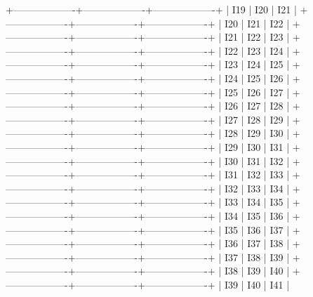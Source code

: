 +-------------------+-------------------+-------------------+
|       I19          |       I20          |       I21         |
+-------------------+-------------------+-------------------+
|       I20          |       I21          |       I22         |
+-------------------+-------------------+-------------------+
|       I21          |       I22          |       I23         |
+-------------------+-------------------+-------------------+
|       I22          |       I23          |       I24         |
+-------------------+-------------------+-------------------+
|       I23          |       I24          |       I25         |
+-------------------+-------------------+-------------------+
|       I24          |       I25          |       I26         |
+-------------------+-------------------+-------------------+
|       I25          |       I26          |       I27         |
+-------------------+-------------------+-------------------+
|       I26          |       I27          |       I28         |
+-------------------+-------------------+-------------------+
|       I27          |       I28          |       I29         |
+-------------------+-------------------+-------------------+
|       I28          |       I29          |       I30         |
+-------------------+-------------------+-------------------+
|       I29          |       I30          |       I31         |
+-------------------+-------------------+-------------------+
|       I30          |       I31          |       I32         |
+-------------------+-------------------+-------------------+
|       I31          |       I32          |       I33         |
+-------------------+-------------------+-------------------+
|       I32          |       I33          |       I34         |
+-------------------+-------------------+-------------------+
|       I33          |       I34          |       I35         |
+-------------------+-------------------+-------------------+
|       I34          |       I35          |       I36         |
+-------------------+-------------------+-------------------+
|       I35          |       I36          |       I37         |
+-------------------+-------------------+-------------------+
|       I36          |       I37          |       I38         |
+-------------------+-------------------+-------------------+
|       I37          |       I38          |       I39         |
+-------------------+-------------------+-------------------+
|       I38          |       I39          |       I40         |
+-------------------+-------------------+-------------------+
|       I39          |       I40          |       I41         |
